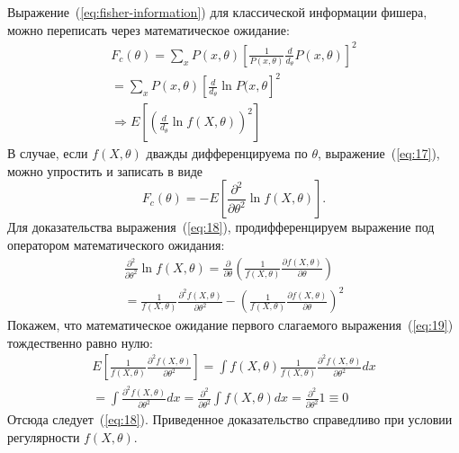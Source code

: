Выражение~(\ref{eq:fisher-information}) для классической информации фишера, можно переписать через математическое ожидание:
\begin{multline}
    \label{eq:17}
        F_c(\theta) =
            \sum_x P(x, \theta)\left[\frac{1}{P(x,\theta)}\frac{d}{d_\theta} P(x, \theta)\right]^2 \\
                = \sum_x P(x,\theta)\left[\frac{d}{d_\theta}
                    \ln P(x,\theta \right]^2 \\
                    \Rightarrow E
                \left[\left(\frac{d}{d_\theta}\ln f(X,\theta)\right)^2
            \right]
\end{multline}
%
В случае, если $f(X,\theta)$ дважды дифференцируема по $\theta$,
выражение~(\ref{eq:17}), можно упростить и записать в виде
%
\begin{equation}\label{eq:18}
  F_c(\theta) = -E \left[\frac{\partial^2}{\partial \theta^2} \ln f(X,\theta)\right].
\end{equation}
%
Для доказательства выражения~(\ref{eq:18}),
продифференцируем выражение под оператором математического ожидания:
%
\begin{multline}
    \label{eq:19}
        \frac{\partial^2}{\partial \theta^2}\ln f(X,\theta) =
            \frac{\partial}{\partial \theta}\left(\frac{1}{f(X,\theta)}
                \frac{\partial f(X,\theta)}{\partial \theta} \right) \\
            = \frac{1}{f(X,\theta)}\frac{\partial^2 f(X,\theta)}{\partial \theta^2} -
        \left(\frac{1}{f(X,\theta)} \frac{\partial f(X,\theta)}{\partial \theta}
    \right)^2
\end{multline}
%
Покажем,
что математическое ожидание первого слагаемого выражения~(\ref{eq:19}) тождественно равно нулю:
%
\begin{multline}
    \label{eq:20}
        E\left[\frac{1}{f(X,\theta)}
            \frac{\partial^2 f(X,\theta)}{\partial \theta^2}\right] =
                \int f (X,\theta) \frac{1}{f(X,\theta)}
                    \frac{\partial^2 f(X, \theta)}{\partial \theta^2}dx \\
                        = \int \frac{\partial^2 f(X,\theta)}{\partial \theta^2}dx =
                    \frac{\partial^2}{\partial \theta^2} \int f(X,\theta)dx
                = \frac{\partial^2}{\partial \theta^2}1 \equiv 0
\end{multline}
%
Отсюда следует~(\ref{eq:18}).
Приведенное доказательство справедливо при условии регулярности $f(X,\theta)$.


